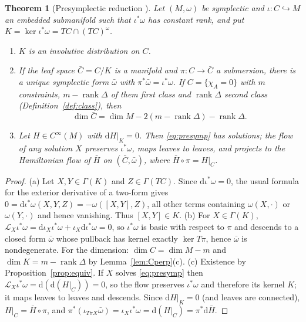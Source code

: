 \documentclass[11pt,a4paper]{article}
\numberwithin{equation}{section}
\theoremstyle{plain}
\newtheorem{theorem}{Theorem}[section]
\theoremstyle{definition}
\theoremstyle{remark}
\newcommand{\rank}{\operatorname{rank}}
\newcommand{\dd}{\mathrm{d}}
\begin{document}
\begin{theorem}[Presymplectic reduction \cite{gnh1978,gotay1982,marle1995,mw1974}]\label{thm:presymp}
Let $(M,\omega)$ be symplectic and $\iota:C\hookrightarrow M$ an embedded submanifold such that $\iota^*\omega$ has constant rank, and put $K=\ker\iota^*\omega=TC\cap(TC)^\omega$.
\begin{enumerate}[label=(\alph*)]
\item $K$ is an involutive distribution on $C$.
\item If the leaf space $\bar C=C/K$ is a manifold and $\pi:C\to\bar C$ a submersion, there is a unique symplectic form $\bar\omega$ with $\pi^*\bar\omega=\iota^*\omega$. If $C=\{\chi_A=0\}$ with $m$ constraints, $m-\rank\Delta$ of them first class and $\rank\Delta$ second class (Definition~\ref{def:class}), then
\begin{equation}\label{eq:dimred}
\dim\bar C=\dim M-2(m-\rank\Delta)-\rank\Delta .
\end{equation}
\item Let $H\in C^\infty(M)$ with $\dd H|_K=0$. Then \eqref{eq:presymp} has solutions; the flow of any solution $X$ preserves $\iota^*\omega$, maps leaves to leaves, and projects to the Hamiltonian flow of $\bar H$ on $(\bar C,\bar\omega)$, where $\bar H\circ\pi=H|_C$.
\end{enumerate}
\end{theorem}
\begin{proof}
(a) Let $X,Y\in\Gamma(K)$ and $Z\in\Gamma(TC)$. Since $\dd\iota^*\omega=0$, the usual formula for the exterior derivative of a two-form gives $0=\dd\iota^*\omega(X,Y,Z)=-\omega([X,Y],Z)$, all other terms containing $\omega(X,\cdot)$ or $\omega(Y,\cdot)$ and hence vanishing. Thus $[X,Y]\in K$.
(b) For $X\in\Gamma(K)$, $\mathcal L_X\iota^*\omega=\dd\iota_X\iota^*\omega+\iota_X\dd\iota^*\omega=0$, so $\iota^*\omega$ is basic with respect to $\pi$ and descends to a closed form $\bar\omega$ whose pullback has kernel exactly $\ker T\pi$, hence $\bar\omega$ is nondegenerate. For the dimension: $\dim C=\dim M-m$ and $\dim K=m-\rank\Delta$ by Lemma~\ref{lem:Cperp}(c).
(c) Existence by Proposition~\ref{prop:equiv}. If $X$ solves \eqref{eq:presymp} then $\mathcal L_X\iota^*\omega=\dd(\dd (H|_C))=0$, so the flow preserves $\iota^*\omega$ and therefore its kernel $K$; it maps leaves to leaves and descends. Since $\dd H|_K=0$ (and leaves are connected), $H|_C=\bar H\circ\pi$, and $\pi^*(\iota_{T\pi X}\bar\omega)=\iota_X\iota^*\omega=\dd(H|_C)=\pi^*\dd\bar H$.
\end{proof}
\end{document}
